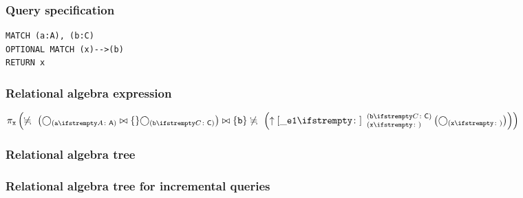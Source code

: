\subsubsection*{Query specification}

\begin{lstlisting}
MATCH (a:A), (b:C)
OPTIONAL MATCH (x)-->(b)
RETURN x
\end{lstlisting}

\subsubsection*{Relational algebra expression}

$\projection{\var{x}} \left(\alldifferent{} \left(\getvertices{a}{A} \join \{\} \getvertices{b}{C}\right) \join \{\var{b}\} \alldifferent{} \left(\expandout{\_e1}{}{x}{b}{C} \left(\getvertices{x}{}\right)\right)\right)$

\subsubsection*{Relational algebra tree}


\subsubsection*{Relational algebra tree for incremental queries}

